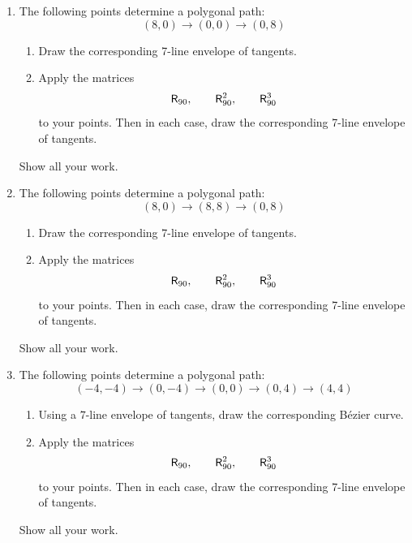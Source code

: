 \begin{enumerate}
\item The following points determine a polygonal path:
\[
(8,0)\to (0,0)\to (0,8)
\]
\begin{enumerate}
\item Draw the corresponding 7-line envelope of tangents. 
\item Apply the matrices
\[
\mathsf{R}_{90}, \qquad \mathsf{R}_{90}^2, \qquad \mathsf{R}_{90}^3
\]
to your points. Then in each case, draw the corresponding 7-line
envelope of tangents. 
\end{enumerate}
Show all your work.

\item The following points determine a polygonal path:
\[
(8,0)\to (8,8)\to (0,8)
\]
\begin{enumerate}
\item Draw the corresponding 7-line envelope of tangents. 
\item Apply the matrices
\[
\mathsf{R}_{90}, \qquad \mathsf{R}_{90}^2, \qquad \mathsf{R}_{90}^3
\]
to your points.  Then in each case, draw the corresponding 7-line
envelope of tangents. 
\end{enumerate}
Show all your work.

\item The following points determine a polygonal path:
\[
(-4,-4) \to (0,-4)\to (0,0)\to (0,4)\to (4,4)
\]
\begin{enumerate}
\item Using a $7$-line envelope of tangents, draw the corresponding B\'ezier
curve. 
\item Apply the matrices
\[
\mathsf{R}_{90}, \qquad \mathsf{R}_{90}^2, \qquad \mathsf{R}_{90}^3
\]
to your points.  Then in each case, draw the corresponding 7-line
envelope of tangents.
\end{enumerate}
Show all your work.

\end{enumerate}
